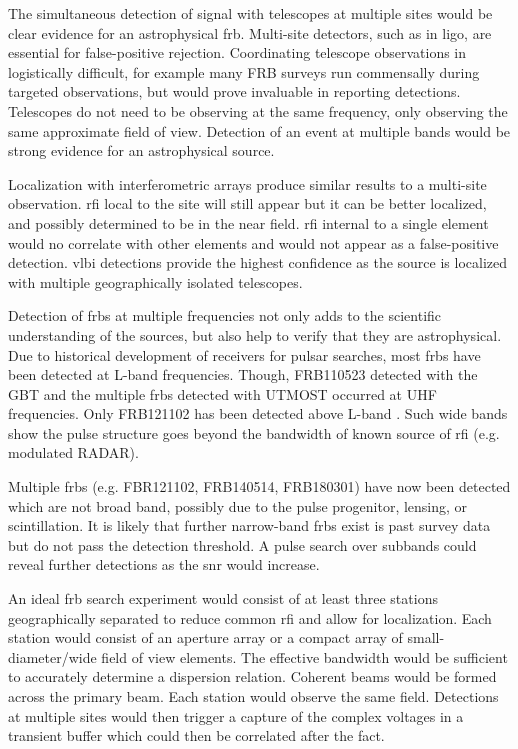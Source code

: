 \documentclass[a4paper,fleqn,usenatbib]{mnras}
\begin{document}
The simultaneous detection of signal with telescopes at multiple sites would be
clear evidence for an astrophysical \gls{frb}.  Multi-site detectors, such as in
\gls{ligo}, are essential for false-positive rejection. Coordinating telescope
observations in logistically difficult, for example many FRB surveys run
commensally during targeted observations, but would prove invaluable in
reporting detections. Telescopes do not need to be observing at the same
frequency, only observing the same approximate field of view. Detection of an
event at multiple bands would be strong evidence for an astrophysical source.

Localization with interferometric arrays produce similar results to a multi-site
observation. \gls{rfi} local to the site will still appear but it can be better
localized, and possibly determined to be in the near field. \gls{rfi} internal
to a single element would no correlate with other elements and would not appear
as a false-positive detection.  \gls{vlbi} detections provide the highest
confidence as the source is localized with multiple geographically isolated
telescopes.

Detection of \glspl{frb} at multiple frequencies not only adds to the scientific
understanding of the sources, but also help to verify that they are
astrophysical.  Due to historical development of receivers for pulsar searches,
most \glspl{frb} have been detected at L-band frequencies. Though, FRB110523
detected with the GBT and the multiple \glspl{frb} detected with UTMOST occurred
at UHF frequencies.  Only FRB121102 has been detected above L-band
\citep{atel10675}.  Such wide bands show the pulse structure goes beyond the
bandwidth of known source of \gls{rfi} (e.g. modulated RADAR). 

Multiple \glspl{frb} (e.g. FBR121102, FRB140514, FRB180301) have now been
detected which are not broad band, possibly due to the pulse progenitor,
lensing, or scintillation. It is likely that further narrow-band \glspl{frb}
exist is past survey data but do not pass the detection threshold. A pulse
search over subbands could reveal further detections as the \gls{snr} would
increase.

An ideal \gls{frb} search experiment would consist of at least three stations
geographically separated to reduce common \gls{rfi} and allow for localization.
Each station would consist of an aperture array or a compact array of
small-diameter/wide field of view elements. The effective bandwidth would be
sufficient to accurately determine a dispersion relation.  Coherent beams would
be formed across the primary beam. Each station would observe the same field.
Detections at multiple sites would then trigger a capture of the complex
voltages in a transient buffer which could then be correlated after the fact. 
\end{document}
